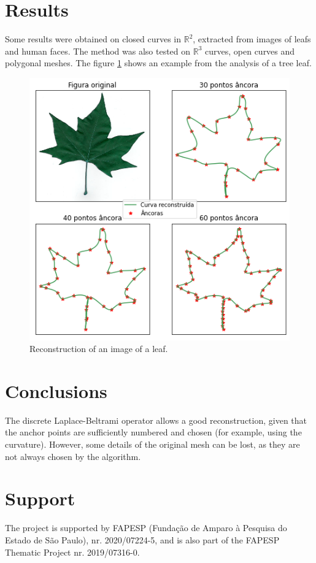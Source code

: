 \documentclass[a4paper,10pt,twocolumn]{article}
\begin{document}
	
	\section*{\hfil Results}
	
	Some results were obtained on closed curves in $\mathbb{R}^2$, extracted from images of leafs and human faces. The method was also tested on $\mathbb{R}^3$ curves, open curves and polygonal meshes. The figure \ref{fig:leafs} shows an example from the analysis of a tree leaf.

	\begin{figure}[ht!]
		\centering
		\includegraphics[width=0.9\linewidth]{imagens/leafs.png}
		\caption{Reconstruction of an image of a leaf.}
		\label{fig:leafs}
	\end{figure}
	
	
	\section*{\hfil Conclusions}
	The discrete Laplace-Beltrami operator allows a good reconstruction, given that the anchor points are sufficiently numbered and chosen (for example, using the curvature). However, some details of the original mesh can be lost, as they are not always chosen by the algorithm.
	
	
	\renewcommand\refname{\hfil References \hfil}
	\begin{center}
	\begin{thebibliography}{LLL}	
	\end{thebibliography}
	\end{center}
	
	\section*{\hfil Support}
	The project is supported by FAPESP (Fundação de Amparo à Pesquisa do Estado de São Paulo), nr. 2020/07224-5, and is also part of the FAPESP Thematic Project nr. 2019/07316-0.
	
	
\end{document}
